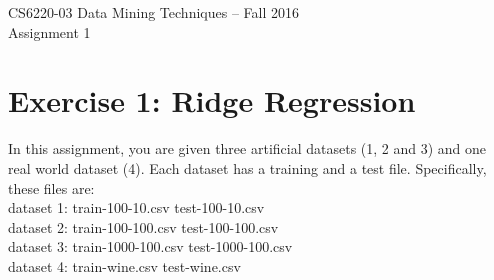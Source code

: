 \documentclass[11pt]{article}
\begin{document}
\begin{center}
\Large CS6220-03 Data Mining  Techniques -- Fall 2016  \\
\normalfont
\vspace{3mm}
Assignment 1\\
\end{center}
\vspace{1mm}

\vspace{4mm}

\section*{Exercise 1: Ridge Regression}

\noindent In this assignment, you are given three artificial datasets (1, 2 and 3) and one real world dataset (4). Each dataset has a training and a test file. Specifically, these files are: \\

\vspace{-3mm}
\indent \indent dataset 1: 	\indent train-100-10.csv \indent \hspace{0.45cm} test-100-10.csv\\
\indent \indent dataset 2: 	\indent train-100-100.csv \hspace{0.85cm} test-100-100.csv\\
\indent \indent dataset 3: 	\indent train-1000-100.csv \hspace{-0.4cm}\indent \indent test-1000-100.csv\\
\indent \indent dataset 4: 	\indent train-wine.csv \hspace{3mm}\indent \indent test-wine.csv\\
\vspace{-3mm}
\end{document}
